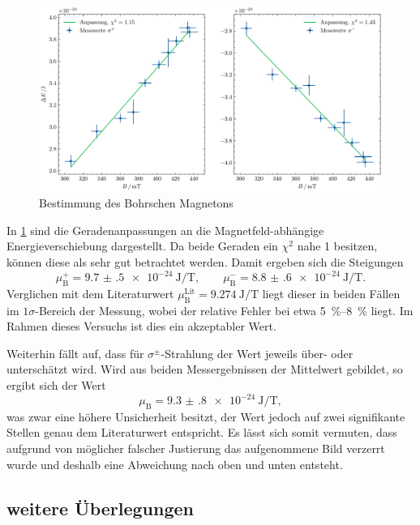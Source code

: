 \begin{figure}[htb]
    \centering
    \includegraphics[width=0.9\linewidth]{../figs/magneton}
    \caption{Bestimmung des Bohrschen Magnetons}
    \label{fig:bohr_magneton}
\end{figure}

In \cref{fig:bohr_magneton} sind die Geradenanpassungen an die Magnetfeld-abhängige 
Energieverschiebung dargestellt. Da beide Geraden ein $\chi^2$ nahe 1 
besitzen, können diese als sehr gut betrachtet werden. Damit ergeben sich die Steigungen 
\begin{equation}
    \mu_\mathrm B^+ = \SI{9.7(5)e-24}{\joule\per\tesla}, 
    \qquad \mu_\mathrm B^- = \SI{8.8(6)e-24}{\joule\per\tesla}
    \label{eq:magneton_exp}.
\end{equation}
Verglichen mit dem Literaturwert $\mu_\mathrm B^\mathrm{Lit} = \SI{9.274}{\joule\per\tesla}$
liegt dieser in beiden Fällen im $1\sigma$-Bereich der Messung, wobei der relative 
Fehler bei etwa \qtyrange{5}{8}{\percent} liegt. Im Rahmen dieses Versuchs 
ist dies ein akzeptabler Wert. 

Weiterhin fällt auf, dass für $\sigma^\pm$-Strahlung der Wert jeweils über- oder unterschätzt 
wird. Wird aus beiden Messergebnissen der Mittelwert gebildet, so ergibt sich der 
Wert 
\begin{equation*}
    \mu_\mathrm B = \SI{9.3(8)e-24}{\joule\per\tesla},
\end{equation*}
was zwar eine höhere Unsicherheit besitzt, der Wert jedoch auf zwei signifikante Stellen 
genau dem Literaturwert entspricht. Es lässt sich somit vermuten, dass aufgrund 
von möglicher falscher Justierung das aufgenommene Bild verzerrt wurde und deshalb 
eine Abweichung nach oben und unten entsteht.

\subsection{weitere Überlegungen}
